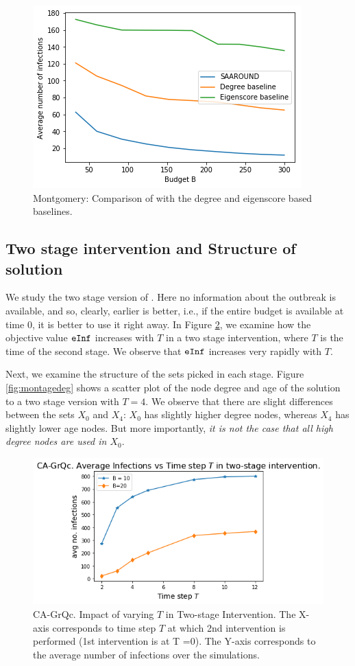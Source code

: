 \begin{figure}[!h]
    \centering
    \includegraphics[scale = 0.55]{Figuresnew/mont_obj.png}
    \caption{Montgomery: Comparison of \algo{} with the degree and eigenscore based baselines.}
    \label{fig:pa1approx}
\end{figure}
\subsection{Two stage intervention and Structure of solution}
We study the two stage version of \prob{}. Here no information about the outbreak is available, and so, clearly, earlier is better, i.e., if the entire budget is available at time $0$, it is better to use it right away. In Figure \ref{fig:temporal}, we examine how the objective value $\texttt{eInf}{}$ increases with $T$ in a two stage intervention, where $T$ is the time of the second stage. We observe that $\texttt{eInf}{}$ increases very rapidly with $T$.

Next, we examine the structure of the sets picked in each stage. Figure \ref{fig:montagedeg} shows a scatter plot of the node degree and age of the solution to a two stage version with $T=4$. We observe that there are slight differences between the sets $X_0$ and $X_4$: $X_0$ has slightly higher degree nodes, whereas $X_4$ has slightly lower age nodes. But more importantly, \emph{it is not the case that all high degree nodes are used in $X_0$}.
\begin{figure}[!h]
    \centering
    \includegraphics[scale = 0.45]{figures/twostage.png}
    \caption{CA-GrQc. Impact of varying $T$ in Two-stage Intervention. The X-axis corresponds to time step $T$ at which 2nd intervention is performed (1st intervention is at T =0). The Y-axis corresponds to the average number of infections over the simulations.}
    \label{fig:temporal}
\end{figure}

